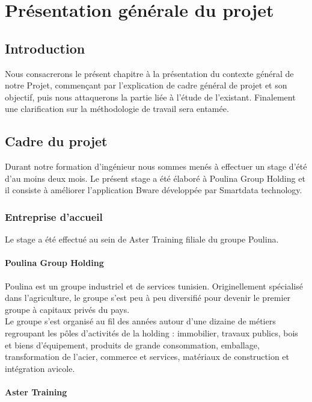 \chapter{Présentation générale du projet}
\section*{Introduction}
\qquad Nous consacrerons le présent chapitre à la présentation du contexte général de notre Projet, commençant par l’explication de cadre général de projet et son objectif, puis nous attaquerons la partie liée à l’étude de l’existant. Finalement une clarification sur la méthodologie de travail sera entamée.

\section{Cadre du projet}

\qquad Durant notre formation d'ingénieur nous sommes menés à effectuer un stage d'été d'au moins deux mois. Le présent stage a été élaboré à Poulina Group Holding et il consiste à améliorer l'application Bware développée par Smartdata technology.

\subsection{Entreprise d'accueil} 

\qquad Le stage a été effectué au sein de Aster Training filiale du groupe Poulina.

\subsubsection{Poulina Group Holding} 

\qquad Poulina est un groupe industriel et de services tunisien. Originellement spécialisé dans l’agriculture, le groupe s’est peu à peu diversifié pour devenir le premier groupe à capitaux privés du pays.\\

Le groupe s’est organisé au fil des années autour d’une dizaine de métiers regroupant les pôles d’activités de la holding : immobilier, travaux publics, bois et biens d’équipement, produits de grande consommation, emballage, transformation de l’acier, commerce et services, matériaux de construction et intégration avicole.

\subsubsection{Aster Training}


